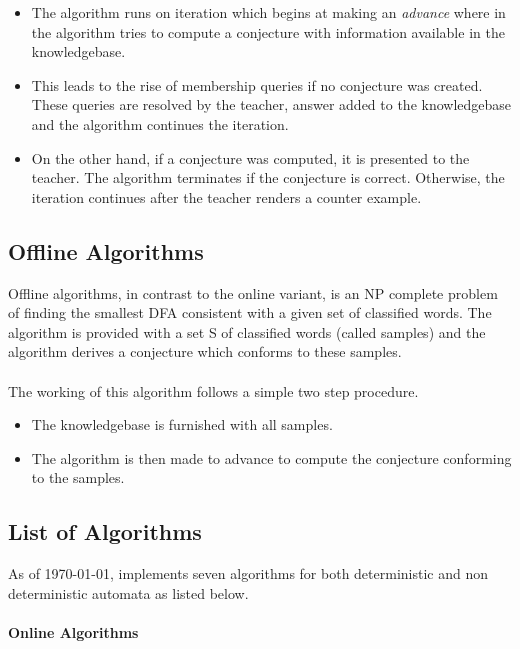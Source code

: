 \begin{itemize}
 \item The algorithm runs on iteration which begins at making an \emph{advance} where in the algorithm tries to compute a conjecture with information available in the knowledgebase.
 \item This leads to the rise of membership queries if no conjecture was created. These queries are resolved by the teacher, answer added to the knowledgebase and the algorithm continues the iteration.
 \item On the other hand, if a conjecture was computed, it is presented to the teacher. The algorithm terminates if the conjecture is correct. Otherwise, the iteration continues after the teacher renders a counter example.
\end{itemize}

\subsection*{Offline Algorithms}

Offline algorithms, in contrast to the online variant, is an NP complete problem of finding the smallest DFA consistent with a given set of classified words.
The algorithm is provided with a set S of classified words (called samples) and the algorithm derives a conjecture which conforms to these samples. 

\paragraph{}
The working of this algorithm follows a simple two step procedure. 
\begin{itemize}
 \item The knowledgebase is furnished with all samples. 
 \item The algorithm is then made to advance to compute the conjecture conforming to the samples. 
\end{itemize}

\subsection*{List of Algorithms}

As of \today, \libalf implements seven algorithms for both deterministic and non deterministic automata as listed below.

\paragraph{Online Algorithms}

